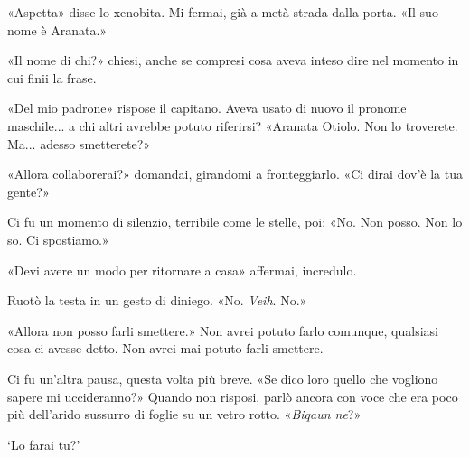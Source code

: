 «Aspetta» disse lo xenobita. Mi fermai, già a metà strada dalla porta.
«Il suo nome è Aranata.»

«Il nome di chi?» chiesi, anche se compresi cosa aveva inteso dire nel
momento in cui finii la frase.

«Del mio padrone» rispose il capitano. Aveva usato di nuovo il pronome
maschile... a chi altri avrebbe potuto riferirsi? «Aranata Otiolo. Non
lo troverete. Ma... adesso smetterete?»

«Allora collaborerai?» domandai, girandomi a fronteggiarlo. «Ci dirai
dov'è la tua gente?»

Ci fu un momento di silenzio, terribile come le stelle, poi: «No. Non
posso. Non lo so. Ci spostiamo.»

«Devi avere un modo per ritornare a casa» affermai, incredulo.

Ruotò la testa in un gesto di diniego. «No. \emph{Veih}. No.»

«Allora non posso farli smettere.» Non avrei potuto farlo comunque,
qualsiasi cosa ci avesse detto. Non avrei mai potuto farli smettere.

Ci fu un'altra pausa, questa volta più breve. «Se dico loro quello che
vogliono sapere mi uccideranno?» Quando non risposi, parlò ancora con
voce che era poco più dell'arido sussurro di foglie su un vetro rotto.
«\emph{Biqaun ne}?»

`Lo farai tu?'

